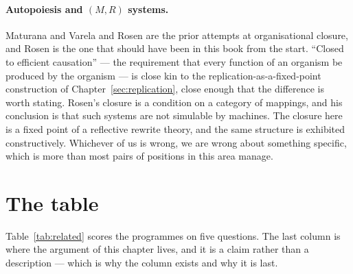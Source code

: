 \paragraph{Autopoiesis and $(M,R)$ systems.}
Maturana and Varela \cite{maturanavarela1980} and Rosen
\cite{rosen1991} are the prior attempts at organisational closure,
and Rosen is the one that should have been in this book from the
start.
``Closed to efficient causation'' --- the requirement that every
function of an organism be produced by the organism --- is close
kin to the replication-as-a-fixed-point construction of
Chapter~\ref{sec:replication}, close enough that the difference is
worth stating.
Rosen's closure is a condition on a category of mappings, and his
conclusion is that such systems are not simulable by machines.
The closure here is a fixed point of a reflective rewrite theory,
and the same structure is exhibited constructively.
Whichever of us is wrong, we are wrong about something specific,
which is more than most pairs of positions in this area manage.

\section*{The table}

Table~\ref{tab:related} scores the programmes on five questions.
The last column is where the argument of this chapter lives, and it
is a claim rather than a description --- which is why the column
exists and why it is last.

